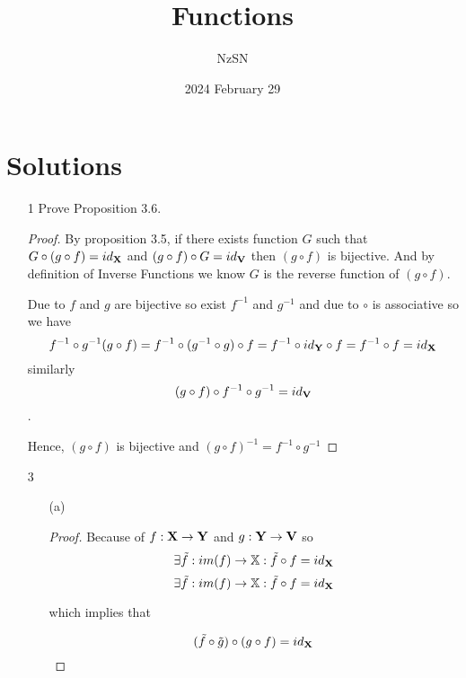 \documentclass[11pt]{book}
\title{Functions}
\author{NzSN}
\date{2024 February 29}
\newcommand{\bb}[1]{\mathbb{#1}}
\newcommand{\ra}{\rightarrow}
\begin{document}
\maketitle

\vspace{0.2 cm}
\section{Solutions}

\begin{enumerate}
  \item[1]
        Prove Proposition 3.6.
        \begin{proof}
          By proposition 3.5, if there exists function $G$ such that $G \circ (g \circ f) = id_{\bf{X}}$ and
          $(g \circ f) \circ G = id_{\bf{V}}$ then $(g \circ f)$ is bijective. And by definition of Inverse
          Functions we know $G$ is the reverse function of $(g \circ f)$.

          Due to $f$ and $g$ are bijective so exist $f^{-1}$ and $g^{-1}$ and due to
          $\circ$ is associative so we have
          $$f^{-1} \circ g^{-1} (g \circ f) = f^{-1} \circ (g^{-1} \circ g) \circ f =
          f^{-1} \circ id_{\bf{Y}} \circ f = f^{-1} \circ f = id_{\bf{X}}$$
          similarly
          $$(g \circ f) \circ f^{-1} \circ g^{-1} = id_{\bf{V}}$$.

          Hence, $(g \circ f)$ is bijective and $(g \circ f)^{-1} = f^{-1} \circ g^{-1}$
        \end{proof}

  \item[3]
        \begin{enumerate}
          \item[(a)]
                \begin{proof}
                Because of $f: \bf{X} \ra \bf{Y}$ and $g: \bf{Y} \ra \bf{V}$ so
                $$\exists \tilde{f}: im(f) \ra \bb{X}: \tilde{f} \circ f = id_{\bf{X}}$$
                $$\exists \tilde{f}: im(f) \ra \bb{X}: \tilde{f} \circ f = id_{\bf{X}}$$

                which implies that

                $$(\tilde{f} \circ \tilde{g}) \circ (g \circ f) = id_{\bf{X}}$$


\end{proof}
\end{enumerate}
\end{enumerate}
\end{document}

